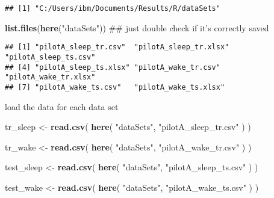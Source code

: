 \documentclass[]{article}
\newenvironment{Shaded}{\begin{snugshade}}{\end{snugshade}}
\newcommand{\KeywordTok}[1]{\textcolor[rgb]{0.13,0.29,0.53}{\textbf{#1}}}
\newcommand{\StringTok}[1]{\textcolor[rgb]{0.31,0.60,0.02}{#1}}
\newcommand{\NormalTok}[1]{#1}
\begin{document}
\begin{verbatim}
## [1] "C:/Users/ibm/Documents/Results/R/dataSets"
\end{verbatim}

\begin{Shaded}
\begin{Highlighting}[]
\KeywordTok{list.files}\NormalTok{(}\KeywordTok{here}\NormalTok{(}\StringTok{"dataSets"}\NormalTok{))  ## just double check if it's correctly saved}
\end{Highlighting}
\end{Shaded}

\begin{verbatim}
## [1] "pilotA_sleep_tr.csv"  "pilotA_sleep_tr.xlsx" "pilotA_sleep_ts.csv" 
## [4] "pilotA_sleep_ts.xlsx" "pilotA_wake_tr.csv"   "pilotA_wake_tr.xlsx" 
## [7] "pilotA_wake_ts.csv"   "pilotA_wake_ts.xlsx"
\end{verbatim}

load the data for each data set

\begin{Shaded}
\begin{Highlighting}[]
\NormalTok{tr_sleep <-}\StringTok{ }
\StringTok{        }\KeywordTok{read.csv}\NormalTok{(}
                \KeywordTok{here}\NormalTok{(}
                        \StringTok{"dataSets"}\NormalTok{, }
                        \StringTok{"pilotA_sleep_tr.csv"}
\NormalTok{                )}
\NormalTok{        )}

\NormalTok{tr_wake <-}\StringTok{ }
\StringTok{        }\KeywordTok{read.csv}\NormalTok{(}
                \KeywordTok{here}\NormalTok{(}
                        \StringTok{"dataSets"}\NormalTok{, }
                        \StringTok{"pilotA_wake_tr.csv"}
\NormalTok{                )}
\NormalTok{        )}


\NormalTok{test_sleep <-}\StringTok{ }
\StringTok{        }\KeywordTok{read.csv}\NormalTok{(}
                \KeywordTok{here}\NormalTok{(}
                        \StringTok{"dataSets"}\NormalTok{, }
                        \StringTok{"pilotA_sleep_ts.csv"}
\NormalTok{                )}
\NormalTok{        )}

\NormalTok{test_wake <-}\StringTok{ }
\StringTok{        }\KeywordTok{read.csv}\NormalTok{(}
                \KeywordTok{here}\NormalTok{(}
                        \StringTok{"dataSets"}\NormalTok{, }
                        \StringTok{"pilotA_wake_ts.csv"}
\NormalTok{                )}
\NormalTok{        )}
\end{Highlighting}
\end{Shaded}
\end{document}
